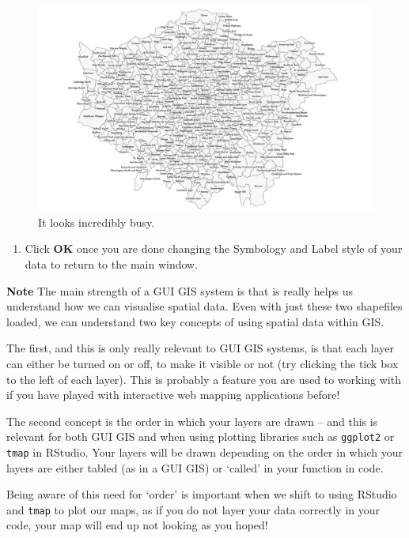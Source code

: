 \documentclass[
]{book}
\providecommand{\tightlist}{%
  \setlength{\itemsep}{0pt}\setlength{\parskip}{0pt}}
\begin{document}
\begin{figure}

{\centering \includegraphics[width=31.31in]{images/w02/wardlabels} 

}

\caption{It looks incredibly busy.}\label{fig:02-busy-labels}
\end{figure}

\begin{enumerate}
\def\labelenumi{\arabic{enumi}.}
\setcounter{enumi}{7}
\tightlist
\item
  Click \textbf{OK} once you are done changing the Symbology and Label style of your data to return to the main window.
\end{enumerate}

\textbf{Note}
The main strength of a GUI GIS system is that is really helps us understand how we can visualise spatial data. Even with just these two shapefiles loaded, we can understand two key concepts of using spatial data within GIS.

The first, and this is only really relevant to GUI GIS systems, is that each layer can either be turned on or off, to make it visible or not (try clicking the tick box to the left of each layer). This is probably a feature you are used to working with if you have played with interactive web mapping applications before!

The second concept is the order in which your layers are drawn -- and this is relevant for both GUI GIS and when using plotting libraries such as \texttt{ggplot2} or \texttt{tmap} in RStudio. Your layers will be drawn depending on the order in which your layers are either tabled (as in a GUI GIS) or `called' in your function in code.

Being aware of this need for `order' is important when we shift to using RStudio and \texttt{tmap} to plot our maps, as if you do not layer your data correctly in your code, your map will end up not looking as you hoped!
\end{document}
